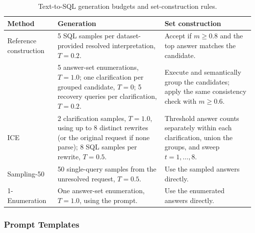 \begin{table}[H]
    \centering
    \caption{Text-to-SQL generation budgets and set-construction rules.}
    \label{tab:sql-frozen-configuration}
    \vspace{3pt}
    \small
    \setlength{\tabcolsep}{3pt}
    \renewcommand{\arraystretch}{1.10}
    \begin{tabularx}{\columnwidth}{@{}p{}p{}X@{}}
        \toprule
        \textbf{Method} & \textbf{Generation} & \textbf{Set construction} \\
        \midrule
        Reference construction
        & 5 SQL samples per dataset-provided resolved interpretation,
          $T=0.2$.
        & Accept if $m\geq0.8$ and the top answer matches the candidate. \\
        \midrule

        \circleclar{}
        & 5 answer-set enumerations, $T=1.0$; one clarification per grouped candidate, $T=0$; 5 recovery queries per clarification, $T=0.2$.
        & Execute and semantically group the candidates; apply the same consistency check with $m\geq0.6$. \\

        ICE
        & 2 clarification samples, $T=1.0$, using up to 8 distinct rewrites (or the original request if none parse); 8 SQL samples per rewrite, $T=0.5$.
        & Threshold answer counts separately within each clarification, union the groups, and sweep $t=1,\ldots,8$. \\

        Sampling-50
        & 50 single-query samples from the unresolved request, $T=0.5$.
        & Use the sampled answers directly. \\

        1-Enumeration
        & One answer-set enumeration, $T=1.0$, using the \circleclar{} prompt.
        & Use the enumerated answers directly. \\
        \bottomrule
    \end{tabularx}

\end{table}

\subsubsection{Prompt Templates}

